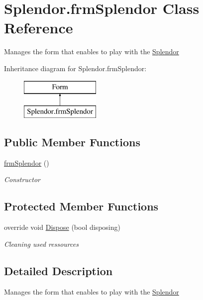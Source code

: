 \hypertarget{class_splendor_1_1frm_splendor}{}\section{Splendor.\+frm\+Splendor Class Reference}
\label{class_splendor_1_1frm_splendor}


Manages the form that enables to play with the \hyperlink{namespace_splendor}{Splendor}  


Inheritance diagram for Splendor.\+frm\+Splendor\+:\begin{figure}[H]
\begin{center}
\leavevmode
\includegraphics[height=2.000000cm]{class_splendor_1_1frm_splendor}
\end{center}
\end{figure}
\subsection*{Public Member Functions}
\begin{DoxyCompactItemize}
\item 
\hyperlink{class_splendor_1_1frm_splendor_ad9c938893d23192acb1996053e3ea87b}{frm\+Splendor} ()
\begin{DoxyCompactList}\small\item\em Constructor \end{DoxyCompactList}\end{DoxyCompactItemize}
\subsection*{Protected Member Functions}
\begin{DoxyCompactItemize}
\item 
override void \hyperlink{class_splendor_1_1frm_splendor_a749f4f1d67c78e74aa1a55aa6fdd754b}{Dispose} (bool disposing)
\begin{DoxyCompactList}\small\item\em Cleaning used ressources \end{DoxyCompactList}\end{DoxyCompactItemize}


\subsection{Detailed Description}
Manages the form that enables to play with the \hyperlink{namespace_splendor}{Splendor} 



